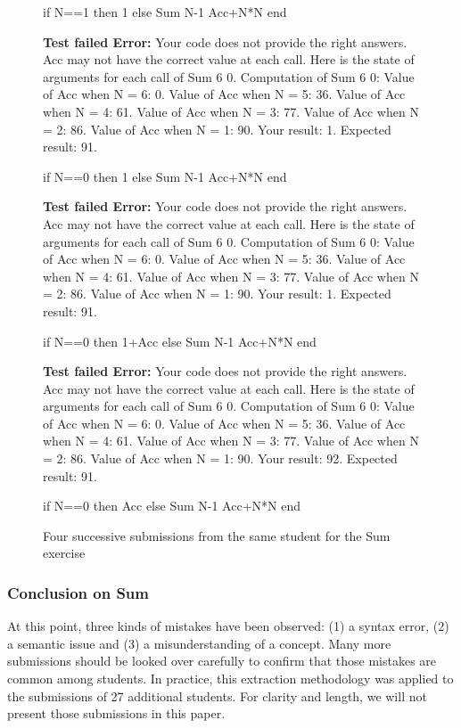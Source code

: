 \documentclass[11pt,a4paper,twoside,openright]{report}
\begin{document}
\begin{figure}[!ht]
  \begin{OZ}
    if N==1 then 1
    else {Sum N-1 Acc+N*N} end
  \end{OZ}
  \textbf{Test failed Error:} Your code does not provide the right 
answers. Acc may not have the correct value at each call. Here is the 
state of arguments for each call of {Sum 6 0}. Computation of {Sum 6 0}: Value 
of Acc when N = 6: 0. Value of Acc when N = 5: 36. Value of Acc when N = 
4: 61. Value of Acc when N = 3: 77. Value of Acc when N = 2: 86. Value of Acc 
when N = 1: 90. Your result: 1. Expected result: 91.
  \begin{OZ}
    if N==0 then 1
    else {Sum N-1 Acc+N*N} end
  \end{OZ}
  \textbf{Test failed Error:} Your code does not provide the right 
answers. Acc may not have the correct value at each call. Here is the 
state of arguments for each call of {Sum 6 0}. Computation of {Sum 6 0}: Value 
of Acc when N = 6: 0. Value of Acc when N = 5: 36. Value of Acc when N = 
4: 61. Value of Acc when N = 3: 77. Value of Acc when N = 2: 86. Value of Acc 
when N = 1: 90. Your result: 1. Expected result: 91.
    \begin{OZ}
    if N==0 then 1+Acc
    else {Sum N-1 Acc+N*N} end
  \end{OZ}
  \textbf{Test failed Error:} Your code does not provide the right 
answers. Acc may not have the correct value at each call. Here is the 
state of arguments for each call of {Sum 6 0}. Computation of {Sum 6 0}: Value 
of Acc when N = 6: 0. Value of Acc when N = 5: 36. Value of Acc when N = 
4: 61. Value of Acc when N = 3: 77. Value of Acc when N = 2: 86. Value of Acc 
when N = 1: 90. Your result: 92. Expected result: 91.
  \begin{OZ}
    if N==0 then Acc
    else {Sum N-1 Acc+N*N} end
  \end{OZ}
  \caption{Four successive submissions from the same student for the Sum 
exercise}
  \label{fig:exo1_sub3}
\end{figure}


\subsubsection{Conclusion on Sum}

At this point, three kinds of mistakes have been observed: (1) a syntax error, 
(2) a semantic issue and (3) a misunderstanding of a concept. Many more 
submissions should be looked over carefully to confirm that those mistakes are 
common among students. In practice, this extraction methodology was applied 
to the submissions of 27 additional students. For clarity and length, we will 
not present those submissions in this paper.
\end{document}
